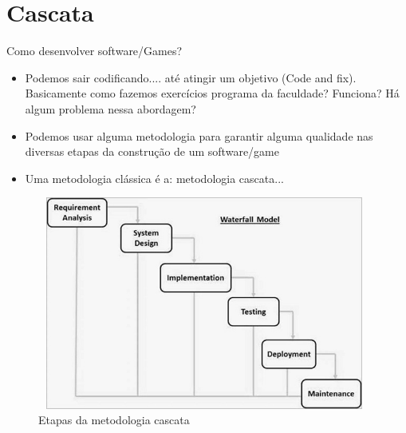 \section{Cascata}

\begin{frame}
\begin{block}{Como desenvolver software/Games?}
	 \begin{itemize}
			  \item Podemos sair codificando.... até atingir um objetivo (Code and fix). Basicamente como fazemos 								exercícios programa da faculdade? Funciona? Há algum problema nessa abordagem?
			  \item Podemos usar alguma metodologia para garantir alguma qualidade nas diversas etapas da construção de um software/game
			  \item Uma metodologia clássica é a: metodologia cascata...
	 \end{itemize}
\end{block}
\end{frame}

\begin{frame}
\begin{block}{}
	 \begin{figure}[!htb]
			\centering	  				
			\includegraphics[height=7cm, width = 11cm]{./pic/sdlc_waterfall_model.jpg}
			\caption{Etapas da metodologia cascata}
			\label{fig_cascata}
		\end{figure}
\end{block}
\end{frame}


